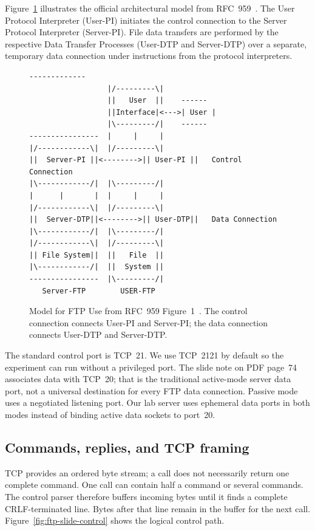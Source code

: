 Figure~\ref{fig:rfc959-model} illustrates the official architectural model from RFC~959~\cite{rfc959}. The User Protocol Interpreter (User-PI) initiates the control connection to the Server Protocol Interpreter (Server-PI). File data transfers are performed by the respective Data Transfer Processes (User-DTP and Server-DTP) over a separate, temporary data connection under instructions from the protocol interpreters.

\begin{figure}[htbp]
\centering
\begin{lstlisting}[basicstyle=\ttfamily\scriptsize,columns=fixed,numbers=none]
                  -------------
                  |/---------\|
                  ||   User  ||    ------
                  ||Interface|<--->| User |
                  |\---------/|    ------
----------------  |     |     |
|/------------\|  |/---------\|
||  Server-PI ||<-------->|| User-PI ||   Control Connection
|\------------/|  |\---------/|
|      |       |  |     |     |
|/------------\|  |/---------\|
||  Server-DTP||<-------->|| User-DTP||   Data Connection
|\------------/|  |\---------/|
|/------------\|  |/---------\|
|| File System||  ||   File  ||
|\------------/|  ||  System ||
----------------  |\---------/|
   Server-FTP        USER-FTP
\end{lstlisting}
\caption{Model for FTP Use from RFC~959 Figure~1~\cite{rfc959}. The control connection connects User-PI and Server-PI; the data connection connects User-DTP and Server-DTP.}
\label{fig:rfc959-model}
\end{figure}

The standard control port is TCP~21. We use TCP~2121 by default so the experiment can run without a privileged port. The slide note on PDF page~74 associates data with TCP~20; that is the traditional active-mode server data port, not a universal destination for every FTP data connection. Passive mode uses a negotiated listening port. Our lab server uses ephemeral data ports in both modes instead of binding active data sockets to port~20.

\subsection{Commands, replies, and TCP framing}
TCP provides an ordered byte stream; a  call does not necessarily return one complete command. One call can contain half a command or several commands. The control parser therefore buffers incoming bytes until it finds a complete CRLF-terminated line. Bytes after that line remain in the buffer for the next call. Figure~\ref{fig:ftp-slide-control} shows the logical control path.

